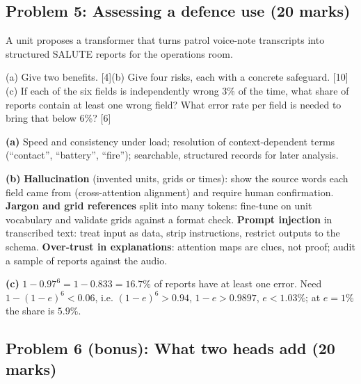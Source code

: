 \documentclass[11pt]{article}
\begin{document}
\subsection{Problem 5: Assessing a defence use \normalfont\small\color{GreyN}(20 marks)}

\begin{prob}A unit proposes a transformer that turns patrol voice-note transcripts into structured SALUTE reports for the operations room.

(a) Give two benefits. [4]\newline (b) Give four risks, each with a concrete safeguard. [10]\newline (c) If each of the six fields is independently wrong 3\% of the time, what share of reports contain at least one wrong field? What error rate per field is needed to bring that below 6\%? [6]\end{prob}

\begin{soln}\textbf{(a)} Speed and consistency under load; resolution of context-dependent terms (``contact'', ``battery'', ``fire''); searchable, structured records for later analysis.

\textbf{(b)} \textbf{Hallucination} (invented units, grids or times): show the source words each field came from (cross-attention alignment) and require human confirmation. \textbf{Jargon and grid references} split into many tokens: fine-tune on unit vocabulary and validate grids against a format check. \textbf{Prompt injection} in transcribed text: treat input as data, strip instructions, restrict outputs to the schema. \textbf{Over-trust in explanations}: attention maps are clues, not proof; audit a sample of reports against the audio.

\textbf{(c)} $1-0.97^6=1-0.833=\mathbf{16.7\%}$ of reports have at least one error. Need $1-(1-e)^6<0.06$, i.e. $(1-e)^6>0.94$, $1-e>0.9897$, $e<\mathbf{1.03\%}$; at $e=1\%$ the share is $5.9\%$.\end{soln}

\subsection{Problem 6 (bonus): What two heads add \normalfont\small\color{GreyN}(20 marks)}
\end{document}
